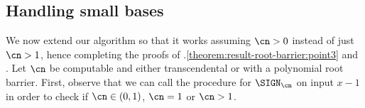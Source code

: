 



\subsection{Handling small bases}\label{subsection:small-bases}

We now extend our algorithm so that it works assuming $\cn > 0$ instead of just
$\cn > 1$, hence completing the proofs of
.\ref{theorem:result-root-barrier:point3} and
. Let $\cn$ be computable and either
transcendental or with a polynomial root barrier. First, observe that we can
call the procedure for $\SIGN_\cn$ on input $x-1$ in order to check if $\cn \in
(0,1)$, $\cn = 1$ or $\cn > 1$. 

